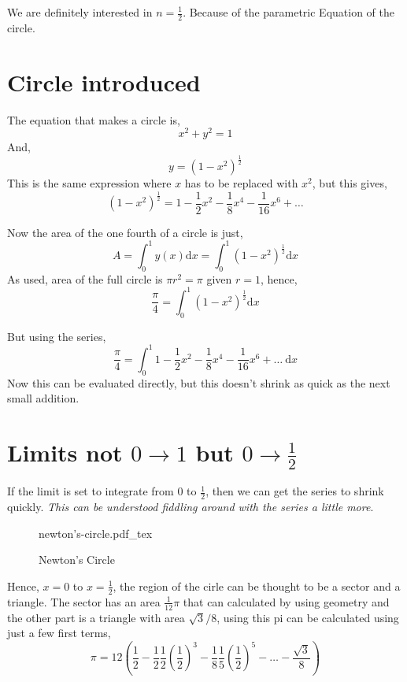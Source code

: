 \documentclass[a4paper, 11pt,twoside]{memoir}
\newcommand{\incfig}[1]{%
    \def\svgwidth{\columnwidth}
    {#1.pdf_tex}
}
\begin{document}
        We are definitely interested in $n = \frac{1}{2} $. Because of the parametric Equation of the circle.

        \section{ Circle introduced }
        The equation that makes a circle is,
        \[ 
        x^2 + y^2  = 1
        \]And, 
        \[ 
            y = \left( 1 - x^2 \right) ^{\frac{1}{2}}
        \] This is the same expression where $x$ has to be replaced with $x^2$, but this gives,
        \[ 
            (1-x^2)^{\frac{1}{2} }= 1 - \frac{1}{2} x^2 - \frac{1}{8}x^{4} - \frac{1}{16}x^{6} + \ldots
        \]

        Now the area of the one fourth of a circle is just,
    \[ 
        A = \int_{0}^{1} y(x) \mathrm{d} x = \int_{0}^{1} (1-x^2)^{\frac{1}{2}} \mathrm{d}  x   
    \]
    As used, area of the full circle is $\pi r^2 = \pi$ given $r =1$, hence, 
    \[ 
        \frac{\pi}{4} = \int_{0}^{1} \left( 1 - x^2 \right) ^{\frac{1}{2}} \mathrm{d} x 
    \]
    
        But using the series,
        \[ 
        \frac{\pi}{4} = \int_{0}^{1}   
1 - \frac{1}{2} x^2 - \frac{1}{8}x^{4} - \frac{1}{16}x^{6} + \ldots
\ \mathrm{d}  x
        \]
            Now this can be evaluated directly, but this doesn't shrink as quick as  the next small addition. 

            \section{ Limits not $0 \to 1$ but $0 \to \frac{1}{2}$ }

            If the limit is set to integrate from $0$ to $\frac{1}{2}$, then we can get the series to shrink quickly. \emph{This can be understood fiddling around with the series a little more}. 
\begin{figure}[ht]
    \centering
    \incfig{newton's-circle}
    \caption{Newton's Circle}
    \label{fig:newton's-circle}
\end{figure}
            Hence, $x=0$ to $x=\frac{1}{2} $, the region of the cirle can be thought to be a  sector and a triangle. The sector has an area $\frac{1}{12} \pi$ that can calculated by using geometry and the other part is a triangle with area $\sqrt{3}/8$, using this pi can be calculated using just a few first terms, 
            \[ 
                \pi = 12 \left( 
                    \frac{1}{2} - \frac{1}{2} \frac{1}{2} \left( \frac{1}{2} \right) ^3 - \frac{1}{8} \frac{1}{5} \left( \frac{1}{2} \right) ^{5} - \ldots - \frac{\sqrt{3} }{8}
                \right) 
            \] 
\end{document}
